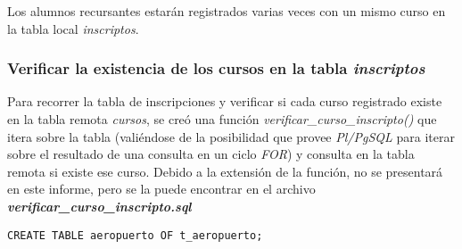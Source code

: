 Los alumnos recursantes estarán registrados varias veces con un mismo curso en la tabla local \emph{inscriptos}. 

\subsubsection{Verificar la existencia de los cursos en la tabla \emph{inscriptos}}

Para recorrer la tabla de inscripciones y verificar si cada curso registrado existe en la tabla remota \emph{cursos}, se creó una función \emph{verificar\_curso\_inscripto()} que itera sobre la tabla (valiéndose de la posibilidad que provee \emph{Pl/PgSQL} para iterar sobre el resultado de una consulta en un ciclo \emph{FOR}) y consulta en la tabla remota si existe ese curso. Debido a la extensión de la función, no se presentará en este informe, pero se la puede encontrar en el archivo \textbf{\emph{verificar\_curso\_inscripto.sql}}








\clearpage
\printbibliography




\vspace*{5mm}
\lstset{style=sql}
\begin{lstlisting}
CREATE TABLE aeropuerto OF t_aeropuerto;
\end{lstlisting}
